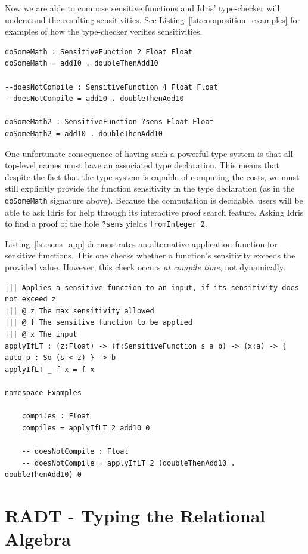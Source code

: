 \documentclass[12pt]{report}
\begin{document}
Now we are able to compose sensitive functions and Idris' type-checker will understand the resulting sensitivities.
See Listing~\ref{lst:composition_examples} for examples of how the type-checker verifies sensitivities.

\begin{lstlisting}[caption={Examples of Sensitive Function Composition},label={lst:composition_examples}]
doSomeMath : SensitiveFunction 2 Float Float
doSomeMath = add10 . doubleThenAdd10

--doesNotCompile : SensitiveFunction 4 Float Float
--doesNotCompile = add10 . doubleThenAdd10

doSomeMath2 : SensitiveFunction ?sens Float Float
doSomeMath2 = add10 . doubleThenAdd10
\end{lstlisting}

One unfortunate consequence of having such a powerful type-system is that all top-level names must have an associated type declaration.
This means that despite the fact that the type-system is capable of computing the costs, we must still explicitly provide the function sensitivity in the type declaration (as in the \texttt{doSomeMath} signature above).
Because the computation is decidable, users will be able to ask Idris for help through its interactive proof search feature.
Asking Idris to find a proof of the hole \texttt{?sens} yields \texttt{fromInteger 2}.

Listing~\ref{lst:sens_app} demonstrates an alternative application function for sensitive functions.
This one checks whether a function's sensitivity exceeds the provided value.
However, this check occurs \textit{at compile time}, not dynamically.

\begin{lstlisting}[caption={Sensitivity-aware function application},label={lst:sens_app}]
||| Applies a sensitive function to an input, if its sensitivity does not exceed z
||| @ z The max sensitivity allowed
||| @ f The sensitive function to be applied
||| @ x The input
applyIfLT : (z:Float) -> (f:SensitiveFunction s a b) -> (x:a) -> { auto p : So (s < z) } -> b
applyIfLT _ f x = f x

namespace Examples

    compiles : Float
    compiles = applyIfLT 2 add10 0

    -- doesNotCompile : Float
    -- doesNotCompile = applyIfLT 2 (doubleThenAdd10 . doubleThenAdd10) 0
\end{lstlisting}

\chapter{RADT - Typing the Relational Algebra}\label{sec:RADT}
\end{document}
